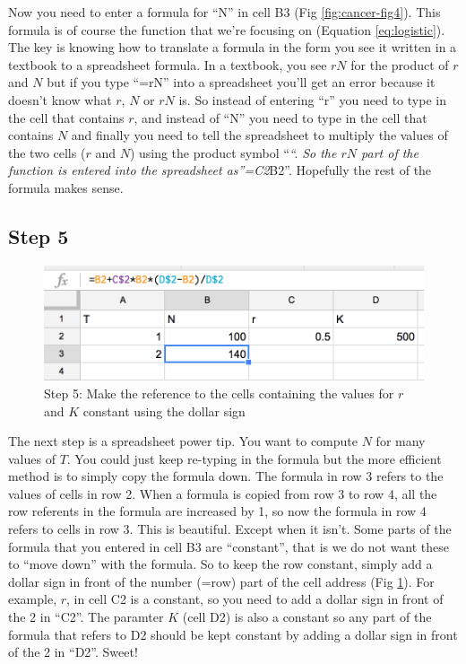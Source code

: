 \documentclass[]{book}
\begin{document}
Now you need to enter a formula for ``N'' in cell B3 (Fig
\ref{fig:cancer-fig4}). This formula is of course the function that
we're focusing on (Equation \eqref{eq:logistic}). The key is knowing how
to translate a formula in the form you see it written in a textbook to a
spreadsheet formula. In a textbook, you see \(rN\) for the product of
\(r\) and \(N\) but if you type ``=rN'' into a spreadsheet you'll get an
error because it doesn't know what \(r\), \(N\) or \(rN\) is. So instead
of entering ``r'' you need to type in the cell that contains \(r\), and
instead of ``N'' you need to type in the cell that contains \(N\) and
finally you need to tell the spreadsheet to multiply the values of the
two cells (\(r\) and \(N\)) using the product symbol ``\emph{``. So the
\(rN\) part of the function is entered into the spreadsheet
as''=C2}B2''. Hopefully the rest of the formula makes sense.

\subsection{Step 5}\label{step-5}

\begin{figure}

{\centering \includegraphics[width=0.8\linewidth]{images/logistic5} 

}

\caption{Step 5: Make the reference to the cells containing the values for $r$ and $K$ constant using the dollar sign}\label{fig:cancer-fig5}
\end{figure}

The next step is a spreadsheet power tip. You want to compute \(N\) for
many values of \(T\). You could just keep re-typing in the formula but
the more efficient method is to simply copy the formula down. The
formula in row 3 refers to the values of cells in row 2. When a formula
is copied from row 3 to row 4, all the row referents in the formula are
increased by 1, so now the formula in row 4 refers to cells in row 3.
This is beautiful. Except when it isn't. Some parts of the formula that
you entered in cell B3 are ``constant'', that is we do not want these to
``move down'' with the formula. So to keep the row constant, simply add
a dollar sign in front of the number (=row) part of the cell address
(Fig \ref{fig:cancer-fig5}). For example, \(r\), in cell C2 is a
constant, so you need to add a dollar sign in front of the 2 in ``C2''.
The paramter \(K\) (cell D2) is also a constant so any part of the
formula that refers to D2 should be kept constant by adding a dollar
sign in front of the 2 in ``D2''. Sweet!
\end{document}
